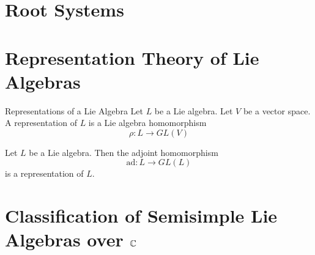 \documentclass[a4paper]{article}
\begin{document}
\pagebreak
\section{Root Systems}

\pagebreak
\section{Representation Theory of Lie Algebras}
\begin{defn}{Representations of a Lie Algebra}{} Let $L$ be a Lie algebra. Let $V$ be a vector space. A representation of $L$ is a Lie algebra homomorphism $$\rho:L\to GL(V)$$
\end{defn}

\begin{lmm}{}{} Let $L$ be a Lie algebra. Then the adjoint homomorphism $$\text{ad}:L\to GL(L)$$ is a representation of $L$. 
\end{lmm}

\pagebreak
\section{Classification of Semisimple Lie Algebras over $\mathbb{C}$}
\end{document}
